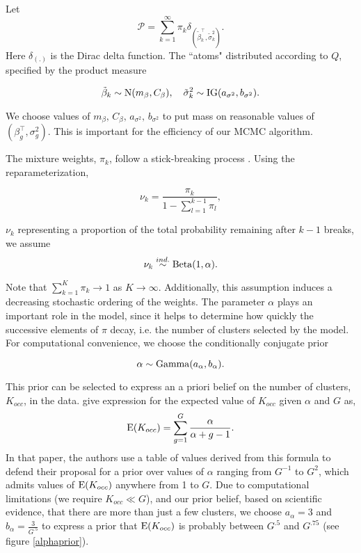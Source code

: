 Let 
\begin{equation}
\mathcal{P} =\sum_{k=1}^\infty \pi_k \delta_{\left(\tilde{\beta}_k^\top ,\tilde{\sigma}^2_k\right)}.
\end{equation}
Here $\delta_{(.)}$ is the Dirac delta function. The ``atoms" distributed according to $Q$, specified by the product measure

\begin{equation}
\tilde{\beta}_k \sim \operatorname{N}(m_\beta, C_\beta),\quad \tilde{\sigma}^2_k \sim \operatorname{IG}(a_{\sigma^2}, b_{\sigma^2}).
\end{equation}

We choose values of $m_\beta,\,C_\beta,\,a_{\sigma^2},\,b_{\sigma^2}$ to put mass on reasonable values of $\left(\beta_g^\top,\sigma^2_g\right)$. This is important for the efficiency of our MCMC algorithm.

The mixture weights, $\pi_k$,  follow a stick-breaking process \cite{sethuraman}. Using the reparameterization,

\begin{equation}
\nu_k = \frac{\pi_k}{1 - \sum_{l=1}^{k-1} \pi_l},
\end{equation}

$\nu_k$ representing a proportion of the total probability remaining after $k-1$ breaks, we assume
\begin{equation}
\nu_k \stackrel{ind.}{\sim} \operatorname{Beta}(1, \alpha).
\end{equation}

Note that $\sum_{k=1}^K \pi_k \rightarrow 1$ as $K\rightarrow \infty$. Additionally, this assumption induces a decreasing stochastic ordering of the weights. The parameter $\alpha$ plays an important role in the model, since it helps to determine how quickly the successive elements of $\pi$ decay, i.e. the number of clusters selected by the model. For computational convenience, we choose the conditionally conjugate prior

\begin{equation}
\alpha \sim \operatorname{Gamma}(a_\alpha,b_\alpha).
\end{equation}

This prior can be selected to express an a priori belief on the number of clusters, $K_{occ}$, in the data. \citet{escobar1994} give expression for the expected value of $K_{occ}$ given $\alpha$ and $G$ as,
\begin{equation}
\operatorname{E}(K_{occ})=\sum_{g=1}^{G} \frac{\alpha}{\alpha + g - 1}.
\end{equation}
In that paper, the authors use a table of values derived from this formula to defend their proposal for a prior over values of $\alpha$ ranging from $G^{-1}$ to $G^{2}$, which admits values of $\operatorname{E}(K_{occ})$ anywhere from 1 to $G$. Due to computational limitations (we require $K_{occ} \ll G$), and our prior belief, based on scientific evidence, that there are more than just a few clusters, we choose $a_\alpha=3$ and $b_\alpha=\frac{3}{G^{.5}}$ to express a prior that $\operatorname{E}(K_{occ})$ is probably between $G^{.5}$ and $G^{.75}$ (see figure \ref{alphaprior}).

